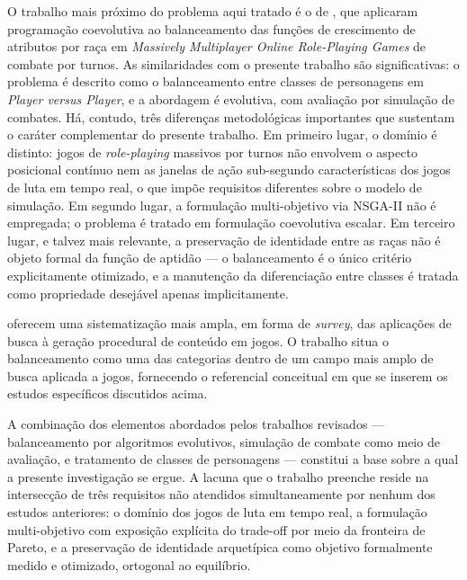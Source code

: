 O trabalho mais próximo do problema aqui tratado é o de , que aplicaram programação coevolutiva ao balanceamento das funções de crescimento de atributos por raça em \textit{Massively Multiplayer Online Role-Playing Games} de combate por turnos. As similaridades com o presente trabalho são significativas: o problema é descrito como o balanceamento entre classes de personagens em \textit{Player versus Player}, e a abordagem é evolutiva, com avaliação por simulação de combates. Há, contudo, três diferenças metodológicas importantes que sustentam o caráter complementar do presente trabalho. Em primeiro lugar, o domínio é distinto: jogos de \textit{role-playing} massivos por turnos não envolvem o aspecto posicional contínuo nem as janelas de ação sub-segundo características dos jogos de luta em tempo real, o que impõe requisitos diferentes sobre o modelo de simulação. Em segundo lugar, a formulação multi-objetivo via NSGA-II não é empregada; o problema é tratado em formulação coevolutiva escalar. Em terceiro lugar, e talvez mais relevante, a preservação de identidade entre as raças não é objeto formal da função de aptidão --- o balanceamento é o único critério explicitamente otimizado, e a manutenção da diferenciação entre classes é tratada como propriedade desejável apenas implicitamente.

 oferecem uma sistematização mais ampla, em forma de \textit{survey}, das aplicações de busca à geração procedural de conteúdo em jogos. O trabalho situa o balanceamento como uma das categorias dentro de um campo mais amplo de busca aplicada a jogos, fornecendo o referencial conceitual em que se inserem os estudos específicos discutidos acima.

A combinação dos elementos abordados pelos trabalhos revisados --- balanceamento por algoritmos evolutivos, simulação de combate como meio de avaliação, e tratamento de classes de personagens --- constitui a base sobre a qual a presente investigação se ergue. A lacuna que o trabalho preenche reside na intersecção de três requisitos não atendidos simultaneamente por nenhum dos estudos anteriores: o domínio dos jogos de luta em tempo real, a formulação multi-objetivo com exposição explícita do trade-off por meio da fronteira de Pareto, e a preservação de identidade arquetípica como objetivo formalmente medido e otimizado, ortogonal ao equilíbrio.